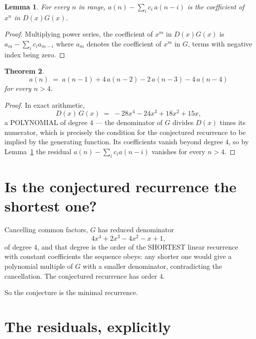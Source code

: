 \documentclass[11pt,a4paper]{article}
\theoremstyle{plain}
\newtheorem{theorem}{Theorem}
\newtheorem{lemma}[theorem]{Lemma}
\theoremstyle{definition}
\begin{document}
\begin{lemma}\label{lem:key}
For every $n$ in range, $a(n)-\sum_i c_i\,a(n-i)$ is the coefficient of $x^{n}$ in
$D(x)G(x)$.
\end{lemma}

\begin{proof}
Multiplying power series, the coefficient of $x^{m}$ in $D(x)G(x)$ is
$a_m-\sum_i c_i a_{m-i}$ where $a_m$ denotes the coefficient of $x^{m}$ in $G$, terms with
negative index being zero.
\end{proof}

\begin{theorem}
\[
a(n)\;=\;a(n-1) + 4\,a(n-2) - 2\,a(n-3) - 4\,a(n-4)
\]
for every $n>4$.
\end{theorem}

\begin{proof}
In exact arithmetic,
\[
D(x)\,G(x)\;=\;- 28 x^{4} - 24 x^{3} + 18 x^{2} + 15 x,
\]
a POLYNOMIAL of degree $4$ --- the denominator of $G$ divides $D(x)$ times its numerator,
which is precisely the condition for the conjectured recurrence to be implied by the
generating function. Its coefficients vanish beyond degree $4$, so by
Lemma~\ref{lem:key} the residual $a(n)-\sum_ic_ia(n-i)$ vanishes for every
$n>4$.
\end{proof}

\section{Is the conjectured recurrence the shortest one?}

Cancelling common factors, $G$ has reduced denominator
\[
4 x^{4} + 2 x^{3} - 4 x^{2} - x + 1,
\]
of degree $4$, and that degree is the order of the SHORTEST linear recurrence with
constant coefficients the sequence obeys: any shorter one would give a polynomial multiple of
$G$ with a smaller denominator, contradicting the cancellation. The conjectured recurrence has
order $4$.

So the conjecture is the minimal recurrence.

\section{The residuals, explicitly}
\end{document}
